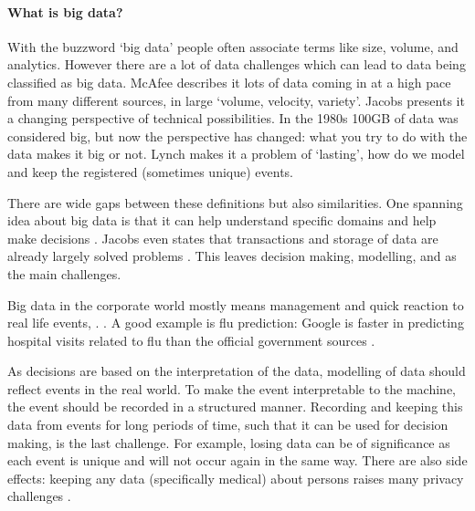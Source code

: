 \paragraph{What is big data?}
With the buzzword `big data' people often associate terms like size, volume, and analytics.
However there are a lot of data challenges which can lead to data being classified as big data.
McAfee \cite{dsb1mcafee} describes it lots of data coming in at a high pace from many different sources, in large `volume, velocity, variety'.
Jacobs \cite{dsb5jacobs} presents it a changing perspective of technical possibilities.
In the 1980s 100GB of data was considered big, but now the perspective has changed: what you try to do with the data makes it big or not.
Lynch \cite{dsb3lynch} makes it a problem of `lasting', how do we model and keep the registered (sometimes unique) events.

There are wide gaps between these definitions but also similarities.
One spanning  idea about big data is that it can help understand specific domains and help make decisions \cite{dsb2lohr}.
Jacobs even states that transactions and storage of data are already largely solved problems \cite{dsb5jacobs}.
This leaves decision making, modelling, and  as the main challenges.

Big data in the corporate world mostly means management and quick reaction to real life events, .
. 
A good example is flu prediction: Google is faster in predicting hospital visits related to flu than the official government sources \cite{dsb8dugas, dsb1mcafee}.

As decisions are based on the interpretation of the data, modelling of data should reflect events in the real world.
To make the event interpretable to the machine, the event should be recorded in a structured manner.
Recording and keeping this data from events for long periods of time, such that it can be used for decision making, is the last challenge.  
For example, losing data can be of significance as each event is unique and will not occur again in the same way.
There are also side effects: keeping any data (specifically medical) about persons raises many privacy challenges \cite{dsb1mcafee}.

